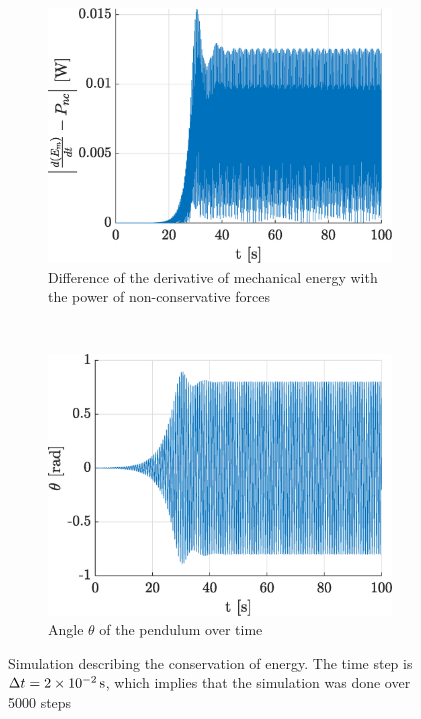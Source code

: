 \documentclass[a4paper,12pt,twoside]{article}
\begin{document}
\begin{figure}[h]
\begin{subfigure}[t]{0.49\textwidth}
	\includegraphics[width=\textwidth]{graphs/d_thm.eps}
	\caption{Difference of the derivative of mechanical energy with the power of non-conservative forces}	
	\label{fig:d-thm-energie}
\end{subfigure}
~
\begin{subfigure}[t]{0.49\textwidth}
	\includegraphics[width=\textwidth]{graphs/d_theta.eps}
	\caption{Angle $\theta$ of the pendulum over time}
	\label{fig:d-thm-theta}
\end{subfigure}
\caption{Simulation describing the conservation of energy. The time step is $\Delta t=\SI{2d-2}{\s}$, which implies that the simulation was done over \num{5000} steps}
\label{fig:d-thm}
\end{figure}
\end{document}
